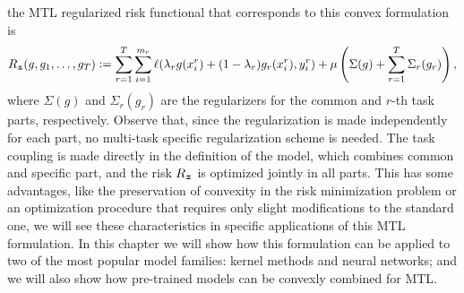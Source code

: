 the MTL regularized risk functional that corresponds to this convex formulation is 
\begin{equation}
    \label{eq:convexmtl_general_regrisk}
    \risk_{\bsample} ({g, g_1, \ldots, g_\ntasks}) \defeq \sum_{r=1}^{\ntasks} \sum_{i=1}^{\npertask_r} \lossf(\lambda_r g(x_i^r) + (1 - \lambda_r) g_r(x_i^r), y_i^r) + \mu \left(\Sigma(g) + \sum_{r=1}^\ntasks \Sigma_r(g_r)\right) ,
\end{equation}
where $\Sigma(g)$ and $\Sigma_r(g_r)$ are the regularizers for the common and $r$-th task parts, respectively. Observe that, since the regularization is made independently for each part, no multi-task specific regularization scheme is needed. The task coupling is made directly in the definition of the model, which combines common and specific part, and the risk $R_{\bm{z}}$ is optimized jointly in all parts.
This has some advantages, like the preservation of convexity in the risk minimization problem or an optimization procedure that requires only slight modifications to the standard one, we will see these characteristics in specific applications of this MTL formulation.
%
In this chapter we will show how this formulation can be applied to two of the most popular model families: kernel methods and neural networks; and we will also show how pre-trained models can be convexly combined for MTL.



